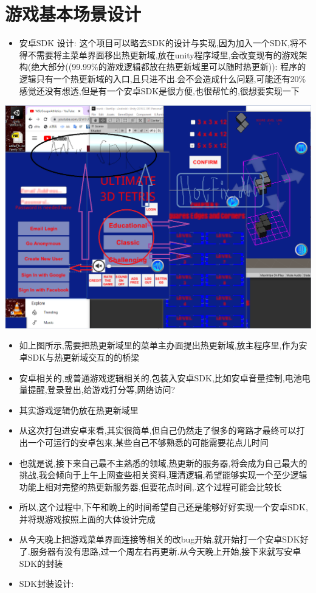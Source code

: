\documentclass[9pt, b5paper]{article}
\begin{document}
\section{游戏基本场景设计}
\label{sec-2}
\begin{itemize}
\item 安卓SDK 设计: 这个项目可以略去SDK的设计与实现,因为加入一个SDK,将不得不需要将主菜单界面移出热更新域,放在unity程序域里,会改变现有的游戏架构(绝大部分((99.99\%的游戏逻辑都放在热更新域里可以随时热更新)): 程序的逻辑只有一个热更新域的入口,且只进不出.会不会造成什么问题,可能还有20\%感觉还没有想透,但是有一个安卓SDK是很方便,也很帮忙的,很想要实现一下
\end{itemize}

\includegraphics[width=.9\linewidth]{./pic/readme_20221125_173637.png}
\begin{itemize}
\item 如上图所示,需要把热更新域里的菜单主办面提出热更新域,放主程序里,作为安卓SDK与热更新域交互的的桥梁
\item 安卓相关的,或普通游戏逻辑相关的,包装入安卓SDK,比如安卓音量控制,电池电量提醒,登录登出,给游戏打分等,网络访问?
\item 其实游戏逻辑仍放在热更新域里
\item 从这次打包进安卓来看,其实很简单,但自己仍然走了很多的弯路才最终可以打出一个可运行的安卓包来,某些自己不够熟悉的可能需要花点儿时间
\item 也就是说,接下来自己最不主熟悉的领域,热更新的服务器,将会成为自己最大的挑战,我会倾向于上午上网查些相关资料,理清逻辑,希望能够实现一个至少逻辑功能上相对完整的热更新服务器,但要花点时间,.这个过程可能会比较长
\item 所以,这个过程中,下午和晚上的时间希望自己还是能够好好实现一个安卓SDK,并将现游戏按照上面的大体设计完成
\item 从今天晚上把游戏菜单界面连接等相关的改bug开始,就开始打一个安卓SDK好了.服务器有没有思路,过一个周左右再更新.从今天晚上开始,接下来就写安卓SDK的封装
\item SDK封装设计:
\end{itemize}
\end{document}
